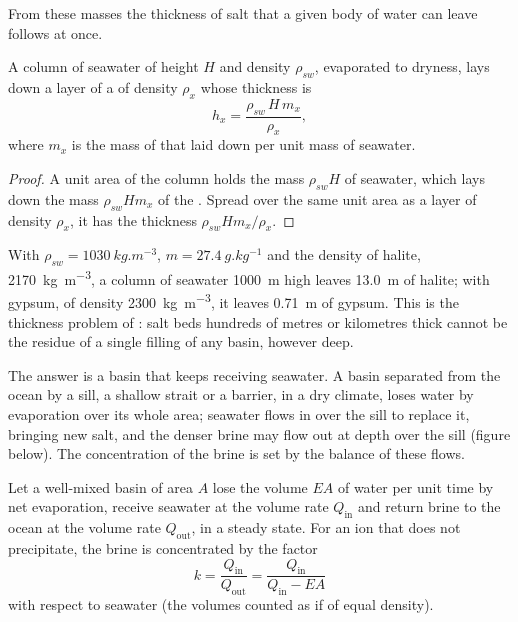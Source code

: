 From these masses the thickness of salt that a given body of water can leave
follows at once.

\begin{proposition}\label{prop:b1:chemical-biogenic-sediments:column}
A column of seawater of height $H$ and density $\rho_{sw}$, evaporated to
dryness, lays down a layer of a  of density $\rho_x$ whose thickness is
\[
h_x = \frac{\rho_{sw}\,H\,m_x}{\rho_x},
\]
where $m_x$ is the mass of that  laid down per unit mass of seawater.
\end{proposition}

\begin{proof}
A unit area of the column holds the mass $\rho_{sw}H$ of seawater, which lays
down the mass $\rho_{sw}Hm_x$ of the . Spread over the same unit area as
a layer of density $\rho_x$, it has the thickness $\rho_{sw}Hm_x/\rho_x$.
\end{proof}

With $\rho_{sw} = \qty{1030}{kg.m^{-3}}$, $m = \qty{27.4}{g.kg^{-1}}$ and the
density of halite, \qty{2170}{kg.m^{-3}}, a column of seawater \qty{1000}{m} high
leaves \qty{13.0}{m} of halite; with gypsum, of density \qty{2300}{kg.m^{-3}}, it
leaves \qty{0.71}{m} of gypsum. This is the thickness problem of :
salt beds hundreds of metres or kilometres thick cannot be the residue of a
single filling of any basin, however deep.

The answer is a basin that keeps receiving seawater. A basin separated from the
ocean by a sill, a shallow strait or a barrier, in a dry climate, loses water by
evaporation over its whole area; seawater flows in over the sill to replace it,
bringing new salt, and the denser brine may flow out at depth over the sill
(figure below). The concentration of the brine
is set by the balance of these flows.

\begin{proposition}\label{prop:b1:chemical-biogenic-sediments:barred}
Let a well-mixed basin of area $A$ lose the volume $EA$ of water per unit time
by net evaporation, receive seawater at the volume rate $Q_{\mathrm{in}}$ and
return brine to the ocean at the volume rate $Q_{\mathrm{out}}$, in a steady
state. For an ion that does not precipitate, the brine is concentrated by the
factor
\[
k = \frac{Q_{\mathrm{in}}}{Q_{\mathrm{out}}} = \frac{Q_{\mathrm{in}}}{Q_{\mathrm{in}} - EA}
\]
with respect to seawater (the volumes counted as if of equal density).
\end{proposition}

